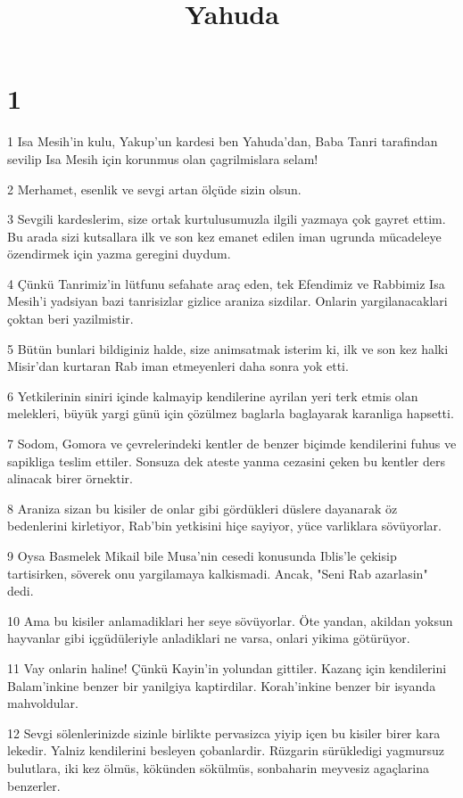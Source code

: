 

\title{Yahuda}


\chapter{1}

\par 1 Isa Mesih'in kulu, Yakup'un kardesi ben Yahuda'dan, Baba Tanri tarafindan sevilip Isa Mesih için korunmus olan çagrilmislara selam!
\par 2 Merhamet, esenlik ve sevgi artan ölçüde sizin olsun.
\par 3 Sevgili kardeslerim, size ortak kurtulusumuzla ilgili yazmaya çok gayret ettim. Bu arada sizi kutsallara ilk ve son kez emanet edilen iman ugrunda mücadeleye özendirmek için yazma geregini duydum.
\par 4 Çünkü Tanrimiz'in lütfunu sefahate araç eden, tek Efendimiz ve Rabbimiz Isa Mesih'i yadsiyan bazi tanrisizlar gizlice araniza sizdilar. Onlarin yargilanacaklari çoktan beri yazilmistir.
\par 5 Bütün bunlari bildiginiz halde, size animsatmak isterim ki, ilk ve son kez halki Misir'dan kurtaran Rab iman etmeyenleri daha sonra yok etti.
\par 6 Yetkilerinin siniri içinde kalmayip kendilerine ayrilan yeri terk etmis olan melekleri, büyük yargi günü için çözülmez baglarla baglayarak karanliga hapsetti.
\par 7 Sodom, Gomora ve çevrelerindeki kentler de benzer biçimde kendilerini fuhus ve sapikliga teslim ettiler. Sonsuza dek ateste yanma cezasini çeken bu kentler ders alinacak birer örnektir.
\par 8 Araniza sizan bu kisiler de onlar gibi gördükleri düslere dayanarak öz bedenlerini kirletiyor, Rab'bin yetkisini hiçe sayiyor, yüce varliklara sövüyorlar.
\par 9 Oysa Basmelek Mikail bile Musa'nin cesedi konusunda Iblis'le çekisip tartisirken, söverek onu yargilamaya kalkismadi. Ancak, "Seni Rab azarlasin" dedi.
\par 10 Ama bu kisiler anlamadiklari her seye sövüyorlar. Öte yandan, akildan yoksun hayvanlar gibi içgüdüleriyle anladiklari ne varsa, onlari yikima götürüyor.
\par 11 Vay onlarin haline! Çünkü Kayin'in yolundan gittiler. Kazanç için kendilerini Balam'inkine benzer bir yanilgiya kaptirdilar. Korah'inkine benzer bir isyanda mahvoldular.
\par 12 Sevgi sölenlerinizde sizinle birlikte pervasizca yiyip içen bu kisiler birer kara lekedir. Yalniz kendilerini besleyen çobanlardir. Rüzgarin sürükledigi yagmursuz bulutlara, iki kez ölmüs, kökünden sökülmüs, sonbaharin meyvesiz agaçlarina benzerler.
